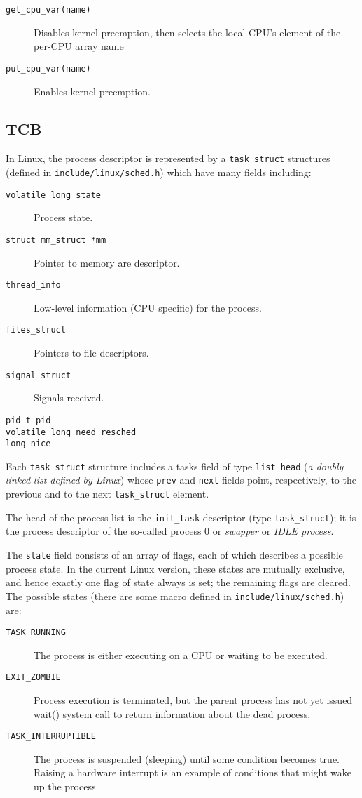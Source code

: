 \documentclass[10pt,a4paper]{article}
\begin{document}
\begin{description}
\item[\texttt{get\_cpu\_var(name)}] Disables kernel preemption, then selects the local CPU’s element of the per-CPU array name
\item[\texttt{put\_cpu\_var(name)}] Enables kernel preemption.
\end{description}


\subsection{TCB}

In Linux, the process descriptor is represented by a \texttt{task\_struct} structures (defined in \texttt{include/linux/sched.h}) which have many fields including:
\begin{description}
\item[\texttt{volatile long state}] Process state.
\item[\texttt{struct mm\_struct *mm}] Pointer to memory are descriptor.
\item[\texttt{thread\_info}] Low-level information (CPU specific) for the process.
\item[\texttt{files\_struct}] Pointers to file descriptors.
\item[\texttt{signal\_struct}] Signals received.
\item[\texttt{pid\_t pid}]
\item[\texttt{volatile long need\_resched}]
\item[\texttt{long nice}]
\end{description}

Each \texttt{task\_struct} structure includes a tasks field of type \texttt{list\_head} (\textit{a doubly linked list defined by Linux}) whose \texttt{prev} and \texttt{next} fields point, respectively, to the previous and to the next \texttt{task\_struct} element.

The head of the process list is the \texttt{init\_task} descriptor (type \texttt{task\_struct}); it is the process descriptor of the so-called process 0 or \textit{swapper} or \textit{IDLE process}.

The \texttt{state} field consists of an array of flags, each of which describes a possible process state. In the current Linux version, these states are mutually exclusive, and hence exactly one flag of state always is set; the remaining flags are cleared. The possible states (there are some macro defined in \texttt{include/linux/sched.h}) are:
\begin{description}
\item[\texttt{TASK\_RUNNING}] The process is either executing on a CPU or waiting to be executed.
\item[\texttt{EXIT\_ZOMBIE}] Process execution is terminated, but the parent process has not yet issued wait() system call to return information about the dead process.
\item[\texttt{TASK\_INTERRUPTIBLE}] The process is suspended (sleeping) until some condition becomes true. Raising a hardware interrupt is an example of conditions that might wake up the process
\end{description}
\end{document}

